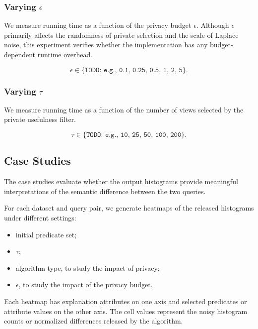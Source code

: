 \subsubsection{Varying $\epsilon$}
\label{subsubsec:runtime-epsilon}

We measure running time as a function of the privacy budget $\epsilon$.
Although $\epsilon$ primarily affects the randomness of private selection and the
scale of Laplace noise, this experiment verifies whether the implementation has
any budget-dependent runtime overhead.

\[
    \epsilon \in \{\texttt{TODO: e.g., 0.1, 0.25, 0.5, 1, 2, 5}\}.
\]


\subsubsection{Varying $\tau$}
\label{subsubsec:runtime-tau}

We measure running time as a function of the number of views selected by the
private usefulness filter.

\[
    \tau \in \{\texttt{TODO: e.g., 10, 25, 50, 100, 200}\}.
\]


\subsection{Case Studies}
\label{subsec:case-studies}

The case studies evaluate whether the output histograms provide meaningful
interpretations of the semantic difference between the two queries.

For each dataset and query pair, we generate heatmaps of the released histograms
under different settings:

\begin{itemize}
    \item initial predicate set;
    \item $\tau$;
    \item algorithm type, to study the impact of privacy;
    \item $\epsilon$, to study the impact of the privacy budget.
\end{itemize}

Each heatmap has explanation attributes on one axis and selected predicates or
attribute values on the other axis. The cell values represent the noisy histogram
counts or normalized differences released by the algorithm.

